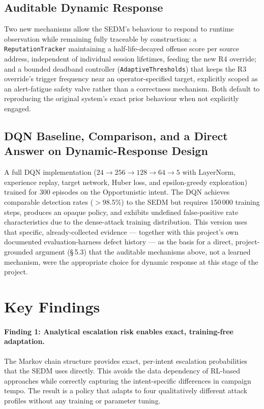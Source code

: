 \subsection{Auditable Dynamic Response}

Two new mechanisms allow the SEDM's behaviour to respond to runtime
observation while remaining fully traceable by construction: a
\texttt{ReputationTracker} maintaining a half-life-decayed offense score per
source address, independent of individual session lifetimes, feeding the new
R4 override; and a bounded deadband controller (\texttt{AdaptiveThresholds})
that keeps the R3 override's trigger frequency near an operator-specified
target, explicitly scoped as an alert-fatigue safety valve rather than a
correctness mechanism. Both default to reproducing the original system's
exact prior behaviour when not explicitly engaged.

\subsection{DQN Baseline, Comparison, and a Direct Answer on Dynamic-Response Design}

A full DQN implementation ($24 \to 256 \to 128 \to 64 \to 5$ with
LayerNorm, experience replay, target network, Huber loss, and epsilon-greedy
exploration) trained for 300 episodes on the Opportunistic intent.
The DQN achieves comparable detection rates ($>$98.5\%) to the SEDM but requires
150\,000 training steps, produces an opaque policy, and exhibits undefined
false-positive rate characteristics due to the dense-attack training distribution.
This version uses that specific, already-collected evidence --- together with
this project's own documented evaluation-harness defect history --- as the
basis for a direct, project-grounded argument (\S\,5.3) that the auditable
mechanisms above, not a learned mechanism, were the appropriate choice for
dynamic response at this stage of the project.

\section{Key Findings}

\paragraph{Finding 1: Analytical escalation risk enables exact, training-free adaptation.}
The Markov chain structure provides exact, per-intent escalation probabilities
that the SEDM uses directly.
This avoids the data dependency of RL-based approaches while correctly
capturing the intent-specific differences in campaign tempo.
The result is a policy that adapts to four qualitatively different attack
profiles without any training or parameter tuning.

